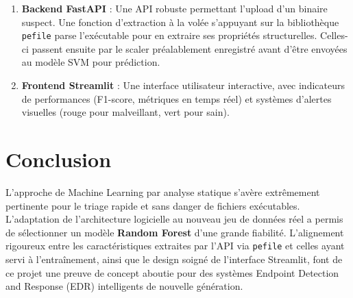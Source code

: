 \documentclass[12pt,a4paper]{article}
\begin{document}
\begin{enumerate}
    \item \textbf{Backend FastAPI} : Une API robuste permettant l'upload d'un binaire suspect. Une fonction d'extraction à la volée s'appuyant sur la bibliothèque \texttt{pefile} parse l'exécutable pour en extraire ses propriétés structurelles. Celles-ci passent ensuite par le scaler préalablement enregistré avant d'être envoyées au modèle SVM pour prédiction.
    \item \textbf{Frontend Streamlit} : Une interface utilisateur interactive, avec indicateurs de performances (F1-score, métriques en temps réel) et systèmes d'alertes visuelles (rouge pour malveillant, vert pour sain).
\end{enumerate}

\section{Conclusion}
L'approche de Machine Learning par analyse statique s'avère extrêmement pertinente pour le triage rapide et sans danger de fichiers exécutables. L'adaptation de l'architecture logicielle au nouveau jeu de données réel a permis de sélectionner un modèle \textbf{Random Forest} d'une grande fiabilité. L'alignement rigoureux entre les caractéristiques extraites par l'API via \texttt{pefile} et celles ayant servi à l'entraînement, ainsi que le design soigné de l'interface Streamlit, font de ce projet une preuve de concept aboutie pour des systèmes Endpoint Detection and Response (EDR) intelligents de nouvelle génération.
\end{document}
